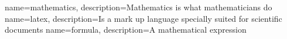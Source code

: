 {
    name=mathematics,
    description={Mathematics is what mathematicians do}
}
%
{
    name=latex,
    description={Is a mark up language specially suited for 
scientific documents}
}
%
{
    name=formula,
    description={A mathematical expression}
}

%
